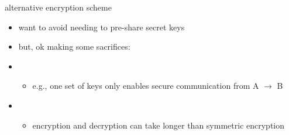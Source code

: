 \begin{frame}{alternative encryption scheme}
    \begin{itemize}
    \item want to avoid needing to pre-share secret keys
    \vspace{.5cm}
    \item but, ok making some sacrifices:
    \item<2-> 
        \begin{itemize}
        \item e.g., one set of keys only enables secure communication from A $\rightarrow$ B
        \end{itemize}
    \item<3-> 
        \begin{itemize}
        \item encryption and decryption can take longer than symmetric encryption
        \end{itemize}
    \end{itemize}
\end{frame}
